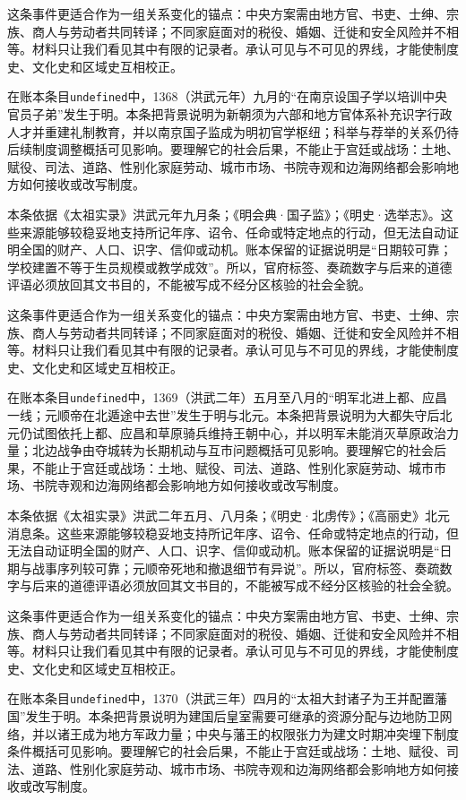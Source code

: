 这条事件更适合作为一组关系变化的锚点：中央方案需由地方官、书吏、士绅、宗族、商人与劳动者共同转译；不同家庭面对的税役、婚姻、迁徙和安全风险并不相等。材料只让我们看见其中有限的记录者。承认可见与不可见的界线，才能使制度史、文化史和区域史互相校正。

在账本条目\texttt{undefined}中，1368（洪武元年）九月的“在南京设国子学以培训中央官员子弟”发生于明。本条把背景说明为新朝须为六部和地方官体系补充识字行政人才并重建礼制教育，并以南京国子监成为明初官学枢纽；科举与荐举的关系仍待后续制度调整概括可见影响。要理解它的社会后果，不能止于宫廷或战场：土地、赋役、司法、道路、性别化家庭劳动、城市市场、书院寺观和边海网络都会影响地方如何接收或改写制度。

本条依据《太祖实录》洪武元年九月条；《明会典·国子监》；《明史·选举志》。这些来源能够较稳妥地支持所记年序、诏令、任命或特定地点的行动，但无法自动证明全国的财产、人口、识字、信仰或动机。账本保留的证据说明是“日期较可靠；学校建置不等于生员规模或教学成效”。所以，官府标签、奏疏数字与后来的道德评语必须放回其文书目的，不能被写成不经分区核验的社会全貌。

这条事件更适合作为一组关系变化的锚点：中央方案需由地方官、书吏、士绅、宗族、商人与劳动者共同转译；不同家庭面对的税役、婚姻、迁徙和安全风险并不相等。材料只让我们看见其中有限的记录者。承认可见与不可见的界线，才能使制度史、文化史和区域史互相校正。

在账本条目\texttt{undefined}中，1369（洪武二年）五月至八月的“明军北进上都、应昌一线；元顺帝在北遁途中去世”发生于明与北元。本条把背景说明为大都失守后北元仍试图依托上都、应昌和草原骑兵维持王朝中心，并以明军未能消灭草原政治力量；北边战争由夺城转为长期机动与互市问题概括可见影响。要理解它的社会后果，不能止于宫廷或战场：土地、赋役、司法、道路、性别化家庭劳动、城市市场、书院寺观和边海网络都会影响地方如何接收或改写制度。

本条依据《太祖实录》洪武二年五月、八月条；《明史·北虏传》；《高丽史》北元消息条。这些来源能够较稳妥地支持所记年序、诏令、任命或特定地点的行动，但无法自动证明全国的财产、人口、识字、信仰或动机。账本保留的证据说明是“日期与战事序列较可靠；元顺帝死地和撤退细节有异说”。所以，官府标签、奏疏数字与后来的道德评语必须放回其文书目的，不能被写成不经分区核验的社会全貌。

这条事件更适合作为一组关系变化的锚点：中央方案需由地方官、书吏、士绅、宗族、商人与劳动者共同转译；不同家庭面对的税役、婚姻、迁徙和安全风险并不相等。材料只让我们看见其中有限的记录者。承认可见与不可见的界线，才能使制度史、文化史和区域史互相校正。

在账本条目\texttt{undefined}中，1370（洪武三年）四月的“太祖大封诸子为王并配置藩国”发生于明。本条把背景说明为建国后皇室需要可继承的资源分配与边地防卫网络，并以诸王成为地方军政力量；中央与藩王的权限张力为建文时期冲突埋下制度条件概括可见影响。要理解它的社会后果，不能止于宫廷或战场：土地、赋役、司法、道路、性别化家庭劳动、城市市场、书院寺观和边海网络都会影响地方如何接收或改写制度。

